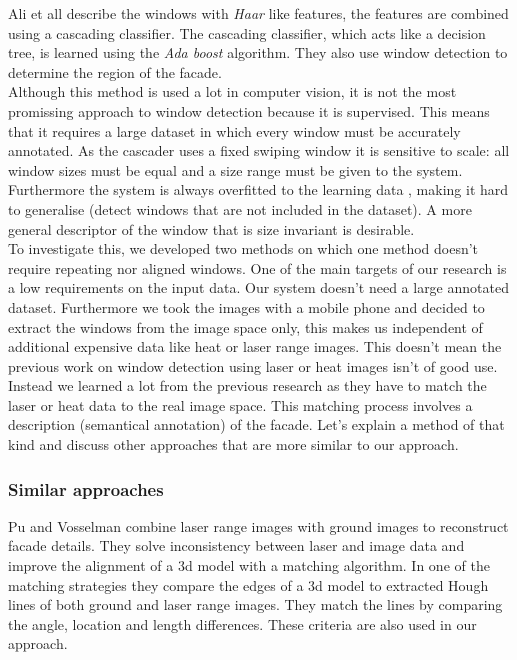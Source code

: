 Ali et all \cite{Ali_facades} describe the windows with \emph{Haar} like
features, the features are combined using a cascading classifier. The cascading
classifier, which acts like a decision tree, is learned using the \emph{Ada
boost} algorithm.  They also use window detection to determine the region of
the facade.\\

Although this method is used a lot in computer vision, it is not the most
promissing approach to window detection because it is supervised.  This means
that it requires a large dataset in which every window must be accurately
annotated.  As the cascader uses a fixed swiping window it is sensitive to
scale: all window sizes must be equal and a size range must be given to the system.
Furthermore the system is always overfitted to the learning data
, making it hard to generalise (detect windows that are
not included in the dataset).  A more general descriptor of the window that is
size invariant is desirable.\\


To investigate this, we developed two methods on which one method doesn't
require repeating nor aligned windows.  One of the main targets of our research
is a low requirements on the input data.  Our system doesn't need 
a large annotated dataset. Furthermore we took the images with a mobile phone
and decided to extract the windows from the image space only, this makes us
independent of additional expensive data like heat or laser range images.
This doesn't mean the previous work on window detection using laser or heat
images isn't of good use.  Instead we learned a lot from the previous research
as they have to match the laser or heat data to the real image space.  This
matching process involves a description (semantical annotation) of the facade.
Let's explain a method of that kind and discuss other approaches that are more
similar to our approach.\\

\subsubsection{Similar approaches}
Pu and Vosselman \cite{Pu_refiningbuilding} combine laser range images with
ground images to reconstruct facade details.  They solve inconsistency between
laser and image data and improve the alignment of a 3d model with a matching
algorithm.  In one of the matching strategies they compare the edges of a 3d
model to extracted Hough lines of both ground and laser range images.  They
match the lines by comparing the angle, location and length differences. These
criteria are also used in our approach.\\


